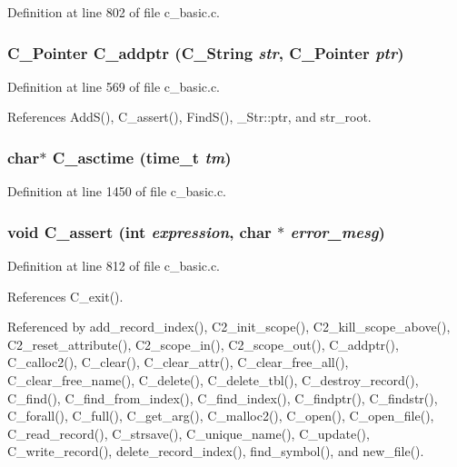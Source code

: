 Definition at line 802 of file c\_\-basic.c.
\subsubsection{\setlength{\rightskip}{0pt plus 5cm}\bf{C\_\-Pointer} C\_\-addptr (\bf{C\_\-String} {\em str}, \bf{C\_\-Pointer} {\em ptr})}\label{c__basic_8h_a50d24783916012cb1b76e6a098d0dc6}




Definition at line 569 of file c\_\-basic.c.

References Add\-S(), C\_\-assert(), Find\-S(), \_\-Str::ptr, and str\_\-root.
\subsubsection{\setlength{\rightskip}{0pt plus 5cm}char$\ast$ C\_\-asctime (time\_\-t {\em tm})}\label{c__basic_8h_7d927796c56a2a830032ce234e68ab5d}




Definition at line 1450 of file c\_\-basic.c.
\subsubsection{\setlength{\rightskip}{0pt plus 5cm}void C\_\-assert (int {\em expression}, char $\ast$ {\em error\_\-mesg})}\label{c__basic_8h_e3a5e797764be416757a30e7cf126d66}




Definition at line 812 of file c\_\-basic.c.

References C\_\-exit().

Referenced by add\_\-record\_\-index(), C2\_\-init\_\-scope(), C2\_\-kill\_\-scope\_\-above(), C2\_\-reset\_\-attribute(), C2\_\-scope\_\-in(), C2\_\-scope\_\-out(), C\_\-addptr(), C\_\-calloc2(), C\_\-clear(), C\_\-clear\_\-attr(), C\_\-clear\_\-free\_\-all(), C\_\-clear\_\-free\_\-name(), C\_\-delete(), C\_\-delete\_\-tbl(), C\_\-destroy\_\-record(), C\_\-find(), C\_\-find\_\-from\_\-index(), C\_\-find\_\-index(), C\_\-findptr(), C\_\-findstr(), C\_\-forall(), C\_\-full(), C\_\-get\_\-arg(), C\_\-malloc2(), C\_\-open(), C\_\-open\_\-file(), C\_\-read\_\-record(), C\_\-strsave(), C\_\-unique\_\-name(), C\_\-update(), C\_\-write\_\-record(), delete\_\-record\_\-index(), find\_\-symbol(), and new\_\-file().
